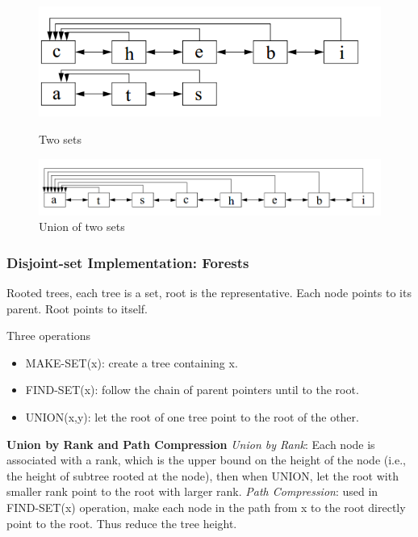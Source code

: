 \begin{figure}[ht]
\begin{minipage}[b]{0.5\linewidth}
\centering
\includegraphics[width=\textwidth]{./Figures/Mitosis_3.png}
\caption{Two sets}
\label{fig:mitosis_3}
\end{minipage}
\hspace{0.5cm}
\begin{minipage}[b]{0.5\linewidth}
\centering
\includegraphics[width=\textwidth]{./Figures/Mitosis_4.png}
\caption{Union of two sets}
\label{fig:mitosis_4}
\end{minipage}
\end{figure}

\subsubsection{Disjoint-set Implementation: Forests}
Rooted trees, each tree is a set, root is the representative. Each node points to its parent. Root points to itself.

Three operations
\begin{itemize}
\item MAKE-SET(x): create a tree containing x.  
\item FIND-SET(x): follow the chain of parent pointers until to the root. 
\item UNION(x,y): let the root of one tree point to the root of the other.  
\end{itemize}

\textbf{Union by Rank and  Path Compression}
\textit{Union by Rank}: Each node is associated with a rank, which is the upper bound on the height of the node (i.e., the height of subtree rooted at the node), then when UNION, let the root with smaller rank point to the root with larger rank. 
\textit{Path Compression}: used in FIND-SET(x) operation, make each node in the path from x to the root  directly point to the root. Thus reduce the tree height.

